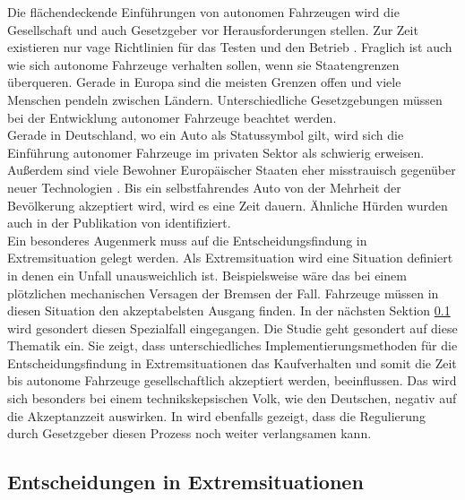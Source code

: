 Die flächendeckende Einführungen von autonomen Fahrzeugen wird die Gesellschaft und auch Gesetzgeber vor Herausforderungen stellen. Zur Zeit existieren nur vage Richtlinien für das Testen und den Betrieb \cite{doi:10.1080/01441647.2018.1494640}. Fraglich ist auch wie sich autonome Fahrzeuge verhalten sollen, wenn sie Staatengrenzen überqueren. Gerade in Europa sind die meisten Grenzen offen und viele Menschen pendeln zwischen Ländern. Unterschiedliche Gesetzgebungen müssen bei der Entwicklung autonomer Fahrzeuge beachtet werden.\\

Gerade in Deutschland, wo ein Auto als Statussymbol gilt, wird sich die Einführung autonomer Fahrzeuge im privaten Sektor als schwierig erweisen. Außerdem sind viele Bewohner Europäischer Staaten eher misstrauisch gegenüber neuer Technologien \cite{technikRadar2019}. Bis ein selbstfahrendes Auto von der Mehrheit der Bevölkerung akzeptiert wird, wird es eine Zeit dauern. Ähnliche Hürden wurden auch in der Publikation \cite{roadblocks} von \citeauthor{roadblocks} identifiziert.\\

Ein besonderes Augenmerk muss auf die Entscheidungsfindung in Extremsituation gelegt werden. Als Extremsituation wird eine Situation definiert in denen ein Unfall unausweichlich ist. Beispielsweise wäre das bei einem plötzlichen mechanischen Versagen der Bremsen der Fall. Fahrzeuge müssen in diesen Situation den akzeptabelsten Ausgang finden. In der nächsten Sektion \ref{ssec:entscheidungen-in-extremsituationen} wird gesondert diesen Spezialfall eingegangen. Die Studie \cite{socialDilemma} geht gesondert auf diese Thematik ein. Sie zeigt, dass unterschiedliches Implementierungsmethoden für die Entscheidungsfindung in Extremsituationen das Kaufverhalten und somit die Zeit bis autonome Fahrzeuge gesellschaftlich akzeptiert werden, beeinflussen. Das wird sich besonders bei einem technikskepsischen Volk, wie den Deutschen, negativ auf die Akzeptanzzeit auswirken. In \citeauthor{socialDilemma} wird ebenfalls gezeigt, dass die Regulierung durch Gesetzgeber diesen Prozess noch weiter verlangsamen kann.\\


\subsection{Entscheidungen in Extremsituationen}
\label{ssec:entscheidungen-in-extremsituationen}

